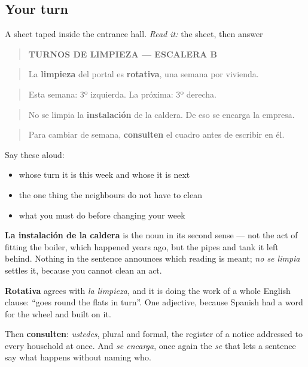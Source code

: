 \subsection*{Your turn}
A sheet taped inside the entrance hall. \emph{Read it:} the sheet, then answer

\begin{quote}
\textbf{TURNOS DE LIMPIEZA — ESCALERA B}
\end{quote}

\begin{quote}
La \textbf{limpieza} del portal es \textbf{rotativa}, una semana por vivienda.
\end{quote}

\begin{quote}
Esta semana: 3º izquierda. La próxima: 3º derecha.
\end{quote}

\begin{quote}
No se limpia la \textbf{instalación} de la caldera. De eso se encarga la empresa.
\end{quote}

\begin{quote}
Para cambiar de semana, \textbf{consulten} el cuadro antes de escribir en él.
\end{quote}

Say these aloud:

\begin{itemize}
\raggedright
  \item whose turn it is this week and whose it is next
  \item the one thing the neighbours do not have to clean
  \item what you must do before changing your week
\end{itemize}

\begin{culture}
\textbf{La instalación de la caldera} is the noun in its second sense — not the act of fitting the boiler, which happened years ago, but the pipes and tank it left behind. Nothing in the sentence announces which reading is meant; \emph{no se limpia} settles it, because you cannot clean an act.

\textbf{Rotativa} agrees with \emph{la limpieza}, and it is doing the work of a whole English clause: \textquotedblleft{}goes round the flats in turn\textquotedblright{}. One adjective, because Spanish had a word for the wheel and built on it.

Then \textbf{consulten}: \emph{ustedes}, plural and formal, the register of a notice addressed to every household at once. And \emph{se encarga}, once again the \emph{se} that lets a sentence say what happens without naming who.
\end{culture}


